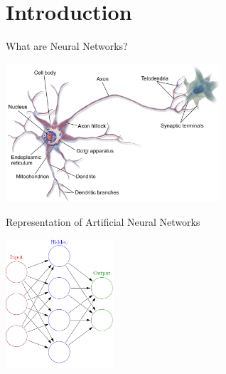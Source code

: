 \setlength{\parskip}{\baselineskip}
\section{Introduction}

\begin{frame}{What are Neural Networks?}
	\begin{center}
		\includegraphics[width=0.6\textwidth]{../Images/CNNArchitectures/Biological-Neuron.png}\\
	\end{center}
\end{frame}

\begin{frame}{Representation of Artificial Neural Networks}
	\begin{center}
		\includegraphics[width=0.3\textwidth]{../Images/CNNArchitectures/simplified-neural-network-graph.png}\\
	\end{center}
\end{frame}

